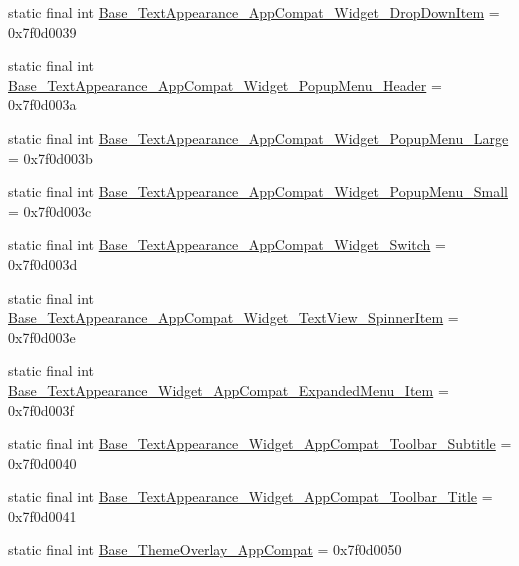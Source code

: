 \begin{DoxyCompactItemize}
\item 
static final int \mbox{\hyperlink{classandroid_1_1support_1_1design_1_1R_1_1style_a4f75f7f5cd1a8bfff243fcd33f3dc6fc}{Base\+\_\+\+Text\+Appearance\+\_\+\+App\+Compat\+\_\+\+Widget\+\_\+\+Drop\+Down\+Item}} = 0x7f0d0039
\item 
static final int \mbox{\hyperlink{classandroid_1_1support_1_1design_1_1R_1_1style_a071fcb2facba65ba209af2cce0afdb51}{Base\+\_\+\+Text\+Appearance\+\_\+\+App\+Compat\+\_\+\+Widget\+\_\+\+Popup\+Menu\+\_\+\+Header}} = 0x7f0d003a
\item 
static final int \mbox{\hyperlink{classandroid_1_1support_1_1design_1_1R_1_1style_ac73eb9fb932bb8b622db57a9f16b18e2}{Base\+\_\+\+Text\+Appearance\+\_\+\+App\+Compat\+\_\+\+Widget\+\_\+\+Popup\+Menu\+\_\+\+Large}} = 0x7f0d003b
\item 
static final int \mbox{\hyperlink{classandroid_1_1support_1_1design_1_1R_1_1style_a5a039a7fe6bfb5737ea3ab4db879e191}{Base\+\_\+\+Text\+Appearance\+\_\+\+App\+Compat\+\_\+\+Widget\+\_\+\+Popup\+Menu\+\_\+\+Small}} = 0x7f0d003c
\item 
static final int \mbox{\hyperlink{classandroid_1_1support_1_1design_1_1R_1_1style_a0fbdc925b35d8ab7f73a1b63ffe619c2}{Base\+\_\+\+Text\+Appearance\+\_\+\+App\+Compat\+\_\+\+Widget\+\_\+\+Switch}} = 0x7f0d003d
\item 
static final int \mbox{\hyperlink{classandroid_1_1support_1_1design_1_1R_1_1style_a0716f65966220a21fc073fb525e91797}{Base\+\_\+\+Text\+Appearance\+\_\+\+App\+Compat\+\_\+\+Widget\+\_\+\+Text\+View\+\_\+\+Spinner\+Item}} = 0x7f0d003e
\item 
static final int \mbox{\hyperlink{classandroid_1_1support_1_1design_1_1R_1_1style_a4268c80f559de038c8cece74dae902c0}{Base\+\_\+\+Text\+Appearance\+\_\+\+Widget\+\_\+\+App\+Compat\+\_\+\+Expanded\+Menu\+\_\+\+Item}} = 0x7f0d003f
\item 
static final int \mbox{\hyperlink{classandroid_1_1support_1_1design_1_1R_1_1style_a31d10ebb57d33a7aa2b3125aa2370409}{Base\+\_\+\+Text\+Appearance\+\_\+\+Widget\+\_\+\+App\+Compat\+\_\+\+Toolbar\+\_\+\+Subtitle}} = 0x7f0d0040
\item 
static final int \mbox{\hyperlink{classandroid_1_1support_1_1design_1_1R_1_1style_a2c616fade1ea43a6d49ebe1f3353f781}{Base\+\_\+\+Text\+Appearance\+\_\+\+Widget\+\_\+\+App\+Compat\+\_\+\+Toolbar\+\_\+\+Title}} = 0x7f0d0041
\item 
static final int \mbox{\hyperlink{classandroid_1_1support_1_1design_1_1R_1_1style_a19e25d7536a593b72a1d1faffc55770e}{Base\+\_\+\+Theme\+Overlay\+\_\+\+App\+Compat}} = 0x7f0d0050

\end{DoxyCompactItemize}

